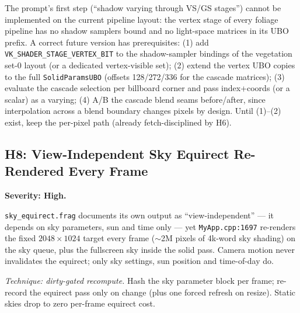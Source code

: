 \documentclass[11pt,a4paper]{article}
\begin{document}
\begin{tcolorbox}[promptbox={Prompt --- H7: vertex-rate foliage shadows --- NOT APPLICABLE as written}]
The prompt's first step (``shadow varying through VS/GS stages'') cannot be
implemented on the current pipeline layout: the vertex stage of every
foliage pipeline has no shadow samplers bound and no light-space matrices in
its UBO prefix. A correct future version has prerequisites:
(1) add \texttt{VK\_SHADER\_STAGE\_VERTEX\_BIT} to the shadow-sampler
bindings of the vegetation set-0 layout (or a dedicated vertex-visible
set); (2) extend the vertex UBO copies to the full \texttt{SolidParamsUBO}
(offsets 128/272/336 for the cascade matrices); (3) evaluate the cascade
selection per billboard corner and pass index+coords (or a scalar) as a
varying; (4) A/B the cascade blend seams before/after, since interpolation
across a blend boundary changes pixels by design. Until (1)--(2) exist,
keep the per-pixel path (already fetch-disciplined by H6).
\end{tcolorbox}

\subsection{H8: View-Independent Sky Equirect Re-Rendered Every Frame}
\label{sec:h8}

\textbf{Severity: High.}

\texttt{sky\_equirect.frag} documents its own output as ``view-independent''
--- it depends on sky parameters, sun and time only --- yet
\texttt{MyApp.cpp:1697} re-renders the fixed $2048\times1024$ target every
frame ($\sim$2M pixels of 4k-word sky shading) on the sky queue, plus the
fullscreen sky inside the solid pass. Camera motion never invalidates the
equirect; only sky settings, sun position and time-of-day do.

\textit{Technique: dirty-gated recompute.} Hash the sky parameter block per
frame; re-record the equirect pass only on change (plus one forced refresh
on resize). Static skies drop to zero per-frame equirect cost.
\end{document}
